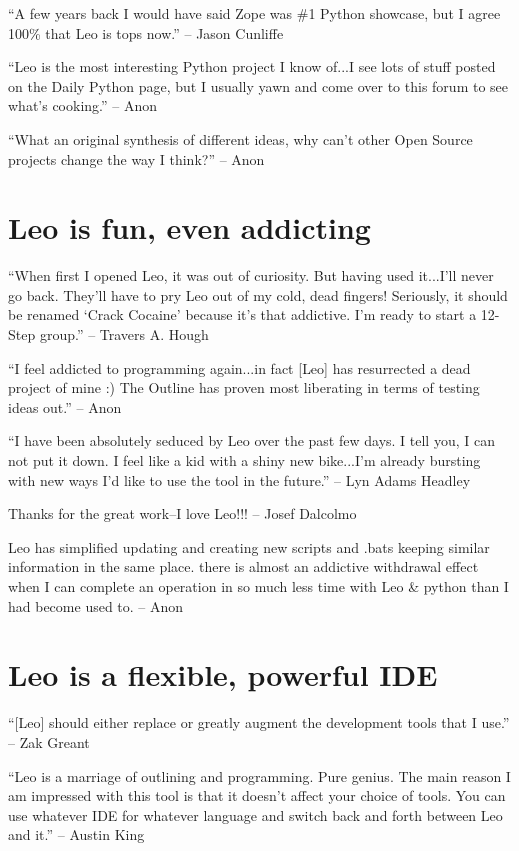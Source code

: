 \documentclass[a4paper,10pt,english]{sphinxmanual}
\begin{document}
``A few years back I would have said Zope was \#1 Python showcase, but I agree
100\% that Leo is tops now.'' -- Jason Cunliffe

``Leo is the most interesting Python project I know of...I see lots of stuff
posted on the Daily Python page, but I usually yawn and come over to this forum
to see what's cooking.'' -- Anon

``What an original synthesis of different ideas, why can't other Open Source
projects change the way I think?'' -- Anon


\section{Leo is fun, even addicting}
\label{testimonials:leo-is-fun-even-addicting}
``When first I opened Leo, it was out of curiosity. But having used it...I'll
never go back. They'll have to pry Leo out of my cold, dead fingers! Seriously,
it should be renamed `Crack Cocaine' because it's that addictive. I'm ready to
start a 12-Step group.'' -- Travers A. Hough

``I feel addicted to programming again...in fact {[}Leo{]} has resurrected a dead
project of mine :) The Outline has proven most liberating in terms of testing
ideas out.'' -- Anon

``I have been absolutely seduced by Leo over the past few days. I tell you, I can
not put it down. I feel like a kid with a shiny new bike...I'm already bursting
with new ways I'd like to use the tool in the future.'' -- Lyn Adams Headley

Thanks for the great work--I love Leo!!! -- Josef Dalcolmo

Leo has simplified updating and creating new scripts and .bats keeping similar
information in the same place. there is almost an addictive withdrawal effect
when I can complete an operation in so much less time with Leo \& python than I
had become used to. -- Anon


\section{Leo is a flexible, powerful IDE}
\label{testimonials:leo-is-a-flexible-powerful-ide}
``{[}Leo{]} should either replace or greatly augment the development tools that I
use.'' -- Zak Greant

``Leo is a marriage of outlining and programming. Pure genius. The main reason I
am impressed with this tool is that it doesn't affect your choice of tools. You
can use whatever IDE for whatever language and switch back and forth between Leo
and it.'' -- Austin King
\end{document}
